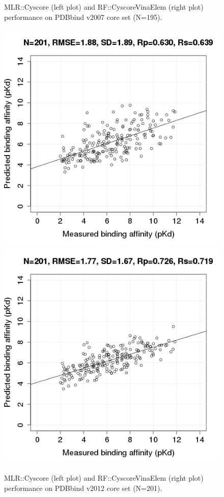 \documentclass[journal=jacsat,manuscript=article]{achemso}
\begin{document}
\begin{figure}
\endminipage\hfill
\caption{MLR::Cyscore (left plot) and RF::CyscoreVinaElem (right plot) performance on PDBbind v2007 core set (N=195).}
\label{fig:tst195}
\end{figure}

\begin{figure}
\includegraphics[width=1.4\linewidth,natwidth=480,natheight=480]{../rfcyscore/x4/mlr/trn-247-tst-201-yp.png}
\endminipage\hfill
{}
\includegraphics[width=1.4\linewidth,natwidth=480,natheight=480]{../rfcyscore/x46/rf/trn-2280-tst-201-yp.png}
\endminipage\hfill
\caption{MLR::Cyscore (left plot) and RF::CyscoreVinaElem (right plot) performance on PDBbind v2012 core set (N=201).}
\label{fig:tst201}
\end{figure}
\end{document}
